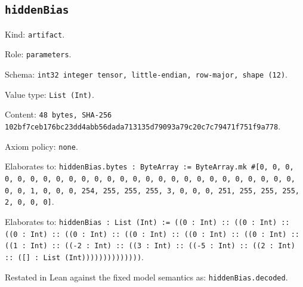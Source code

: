 \documentclass[11pt]{article}
\begin{document}
\subsection*{\texttt{hiddenBias}}
\noindent Kind: \texttt{artifact}.\par
\noindent Role: \texttt{parameters}.\par
\noindent Schema: \texttt{int32 integer tensor, little-endian, row-major, shape (12)}.\par
\noindent Value type: \texttt{List (Int)}.\par
\noindent Content: \texttt{48 bytes, SHA-256 102bf7ceb176bc23dd4abb56dada713135d79093a79c20c7c79471f751f9a778}.\par
\noindent Axiom policy: \texttt{none}.\par
\noindent Elaborates to: \texttt{hiddenBias.bytes : ByteArray := ByteArray.mk \#[0, 0, 0, 0, 0, 0, 0, 0, 0, 0, 0, 0, 0, 0, 0, 0, 0, 0, 0, 0, 0, 0, 0, 0, 0, 0, 0, 0, 1, 0, 0, 0, 254, 255, 255, 255, 3, 0, 0, 0, 251, 255, 255, 255, 2, 0, 0, 0]}.\par
\noindent Elaborates to: \texttt{hiddenBias : List (Int) := ((0 : Int) :: ((0 : Int) :: ((0 : Int) :: ((0 : Int) :: ((0 : Int) :: ((0 : Int) :: ((0 : Int) :: ((1 : Int) :: ((-2 : Int) :: ((3 : Int) :: ((-5 : Int) :: ((2 : Int) :: ([] : List (Int))))))))))))))}.\par
\noindent Restated in Lean against the fixed model semantics as: \texttt{hiddenBias.decoded}.\par
\end{document}
